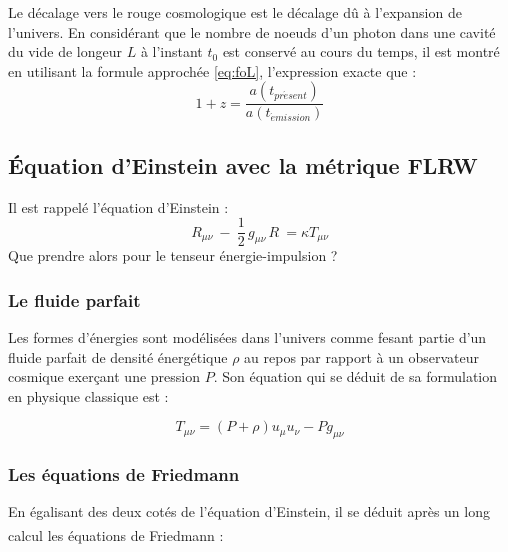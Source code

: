 \documentclass[10pt, a4paper]{report}
\numberwithin{equation}{subsection}
\begin{document}
Le décalage vers le rouge cosmologique est le décalage dû à l'expansion de l'univers. En considérant que le nombre de noeuds d'un photon dans une cavité du vide de longeur $L$ à l'instant $t_0$ est conservé au cours du temps, il est montré en utilisant la formule approchée \ref{eq:foL}, l'expression exacte que :
\begin{equation} \label{eq:zC}
\boxed{1+z = \frac{a(t_{pr\acute esent})}{a(t_{\acute emission})}}
\end{equation}

\subsection{\uppercase{é}quation d'Einstein avec la métrique FLRW}
Il est rappelé l'équation d'Einstein :
\begin{equation} \label{eq:EFE}
\boxed{R_{\mu \nu} \ - \ \frac{1}{2} \, g_{\mu \nu} \, R  \  =  \kappa T_{\mu \nu}}
\end{equation}
Que prendre alors pour le tenseur énergie-impulsion ?
\subsubsection{Le fluide parfait}
Les formes d'énergies sont modélisées dans l'univers comme fesant partie d'un fluide parfait de densité énergétique $\rho$ au repos par rapport à un observateur cosmique exerçant une pression $P$. Son équation qui se déduit de sa formulation en physique classique est : 

\begin{equation} \label{eq:FP}
\boxed{T_{\mu\nu} = (P + \rho) u_\mu u_\nu - P g_{\mu\nu}}
\end{equation}

\subsubsection{Les équations de Friedmann}
En égalisant des deux cotés de l'équation d'Einstein, il se déduit après un long calcul\textsuperscript{\cite{cours_RG1}} les équations de Friedmann :
\end{document}
